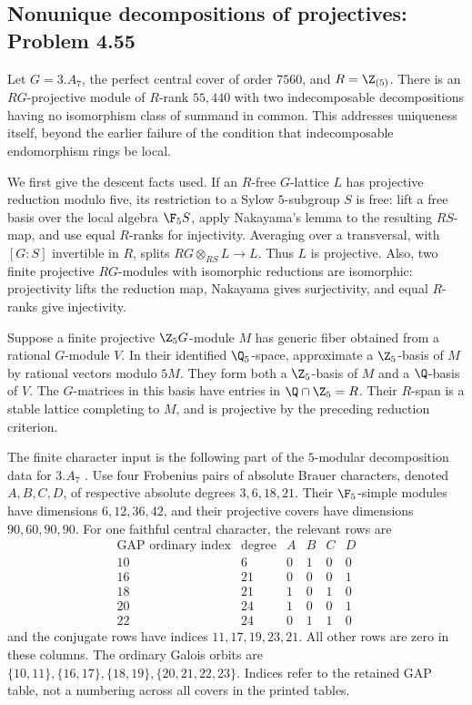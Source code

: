 \subsection{Nonunique decompositions of projectives: Problem 4.55}
\label{cand:4.55}

Let \(G=3.A_7\), the perfect central cover of order \(7560\),
and \(R=\Z_{(5)}\). There is an \(RG\)-projective module of
\(R\)-rank \(55{,}440\) with two indecomposable decompositions
having no isomorphism class of summand in common. This addresses
uniqueness itself, beyond the earlier failure of the condition
that indecomposable endomorphism rings be local.

We first give the descent facts used. If an \(R\)-free
\(G\)-lattice \(L\) has projective reduction modulo five,
its restriction to a Sylow \(5\)-subgroup \(S\) is free:
lift a free basis over the local algebra \(\F_5S\),
apply Nakayama's lemma to the resulting \(RS\)-map, and
use equal \(R\)-ranks for injectivity. Averaging over a
transversal, with \([G:S]\) invertible in \(R\), splits
\(RG\otimes_{RS}L\to L\). Thus \(L\) is projective.
Also, two finite projective \(RG\)-modules with isomorphic
reductions are isomorphic: projectivity lifts the reduction
map, Nakayama gives surjectivity, and equal \(R\)-ranks
give injectivity.

Suppose a finite projective \(\Z_5G\)-module \(M\) has
generic fiber obtained from a rational \(G\)-module \(V\).
In their identified \(\Q_5\)-space, approximate a
\(\Z_5\)-basis of \(M\) by rational vectors modulo \(5M\).
They form both a \(\Z_5\)-basis of \(M\) and a
\(\Q\)-basis of \(V\). The \(G\)-matrices in this basis
have entries in \(\Q\cap\Z_5=R\). Their \(R\)-span
is a stable lattice completing to \(M\), and is
projective by the preceding reduction criterion.

The finite character input is the following part of the
\(5\)-modular decomposition data for \(3.A_7\)
\cite{a7-decomposition,ctbl-3a7}. Use four Frobenius pairs
of absolute Brauer characters, denoted \(A,B,C,D\),
of respective absolute degrees \(3,6,18,21\).
Their \(\F_5\)-simple modules have dimensions
\(6,12,36,42\), and their projective covers have
dimensions \(90,60,90,90\). For one faithful central
character, the relevant rows are
\[
\begin{array}{c|r|rrrr}
 \text{GAP ordinary index}&\text{degree}&A&B&C&D\\ \hline
 10&6 &0&1&0&0\\
 16&21&0&0&0&1\\
 18&21&1&0&1&0\\
 20&24&1&0&0&1\\
 22&24&0&1&1&0
\end{array}
\]
and the conjugate rows have indices \(11,17,19,23,21\).
All other rows are zero in these columns.
The ordinary Galois orbits are
\(\{10,11\},\{16,17\},\{18,19\},\{20,21,22,23\}\).
Indices refer to the retained GAP table, not a numbering
across all covers in the printed tables.

